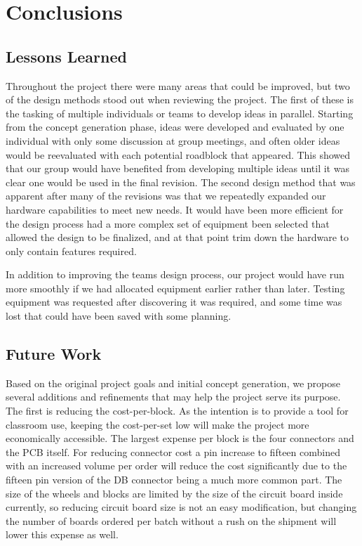 \documentclass[12pt,a4paper]{article}
\begin{document}
     \section{Conclusions}
     \subsection{Lessons Learned}
     Throughout the project there were many areas that could be improved, but two of the design methods stood out when reviewing the project. The first of these is the tasking of multiple individuals or teams to develop ideas in parallel. Starting from the concept generation phase, ideas were developed and evaluated by one individual with only some discussion at group meetings, and often older ideas would be reevaluated with each potential roadblock that appeared. This showed that our group would have benefited from developing multiple ideas until it was clear one would be used in the final revision.  The second design method that was apparent after many of the revisions was that we repeatedly expanded our hardware capabilities to meet new needs. It would have been more efficient for the design process had a more complex set of equipment been selected that allowed the design to be finalized, and at that point trim down the hardware to only contain features required.
     
     In addition to improving the team\textquotesingle s design process, our project would have run more smoothly if we had allocated equipment earlier rather than later. Testing equipment was requested after discovering it was required, and some time was lost that could have been saved with some planning.
     \subsection{Future Work}	
     Based on the original project goals and initial concept generation, we propose several additions and refinements that may help the project serve its purpose. The first is reducing the cost-per-block. As the intention is to provide a tool for classroom use, keeping the cost-per-set low will make the project more economically accessible. The largest expense per block is the four connectors and the PCB itself. For reducing connector cost a pin increase to fifteen combined with an increased volume per order will reduce the cost significantly due to the fifteen pin version of the DB connector being a much more common part. The size of the wheels and blocks are limited by the size of the circuit board inside currently, so reducing circuit board size is not an easy modification, but changing the number of boards ordered per batch without a rush on the shipment will lower this expense as well.
     
\end{document}
